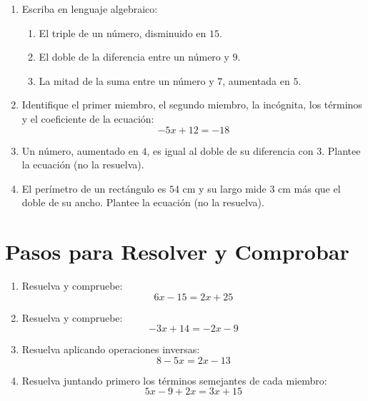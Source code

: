 \documentclass[12pt, letterpaper]{article}
\begin{document}
\begin{enumerate}[leftmargin=*]
  \item Escriba en lenguaje algebraico:
        \begin{enumerate}[label=\alph*)]
          \item El triple de un número, disminuido en $15$.
          \item El doble de la diferencia entre un número y $9$.
          \item La mitad de la suma entre un número y $7$, aumentada en $5$.
        \end{enumerate}

  \item Identifique el primer miembro, el segundo miembro, la incógnita, los términos y el coeficiente de la ecuación:
        \[
          -5x + 12 = -18
        \]

  \item Un número, aumentado en $4$, es igual al doble de su diferencia con $3$. Plantee la ecuación (no la resuelva).

  \item El perímetro de un rectángulo es $54$ cm y su largo mide $3$ cm más que el doble de su ancho. Plantee la ecuación (no la resuelva).
\end{enumerate}

\newpage

\section{Pasos para Resolver y Comprobar}

\begin{enumerate}[leftmargin=*]
  \item Resuelva y compruebe:
        \[
          6x - 15 = 2x + 25
        \]

  \item Resuelva y compruebe:
        \[
          -3x + 14 = -2x - 9
        \]

  \item Resuelva aplicando operaciones inversas:
        \[
          8 - 5x = 2x - 13
        \]

  \item Resuelva juntando primero los términos semejantes de cada miembro:
        \[
          5x - 9 + 2x = 3x + 15
        \]
\end{enumerate}
\end{document}
